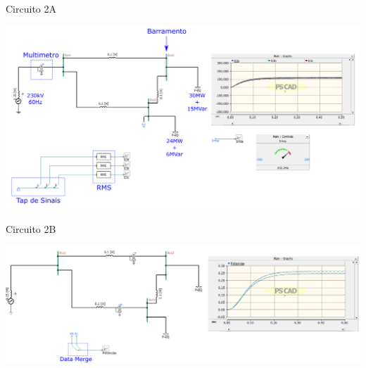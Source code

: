 







\begin{frame}{Circuito 2A}
\centering



\includegraphics[width=0.95\linewidth]{./figuras/Segundo-Circuito/SIM2a}



\end{frame}






\begin{frame}{Circuito 2B}
\centering



\includegraphics[width=0.95\linewidth]{./figuras/Segundo-Circuito/SIM2b}



\end{frame}







